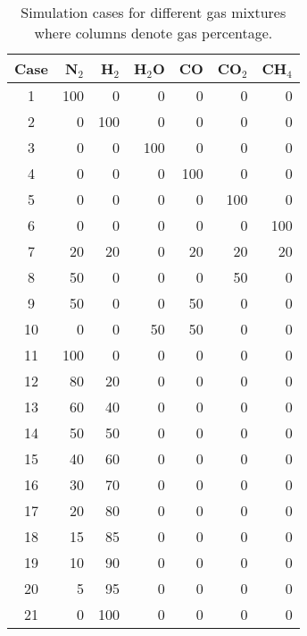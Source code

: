 \begin{table}[H]
    \centering
    \caption{Simulation cases for different gas mixtures where columns denote gas percentage.}
    \begin{tabular}{crrrrrr}
        \hline
        Case    & N$_2$ & H$_2$     & H$_2$O    & CO    & CO$_2$    & CH$_4$    \\
        \hline
        1       & 100   & 0         & 0         & 0     & 0         & 0         \\
        2       & 0     & 100       & 0         & 0     & 0         & 0         \\
        3       & 0     & 0         & 100       & 0     & 0         & 0         \\
        4       & 0     & 0         & 0         & 100   & 0         & 0         \\
        5       & 0     & 0         & 0         & 0     & 100       & 0         \\
        6       & 0     & 0         & 0         & 0     & 0         & 100       \\
        7       & 20    & 20        & 0         & 20    & 20        & 20        \\
        8       & 50    & 0         & 0         & 0     & 50        & 0         \\
        9       & 50    & 0         & 0         & 50    & 0         & 0         \\
        10      & 0     & 0         & 50        & 50    & 0         & 0         \\
        11      & 100   & 0         & 0         & 0     & 0         & 0         \\
        12      & 80    & 20        & 0         & 0     & 0         & 0         \\
        13      & 60    & 40        & 0         & 0     & 0         & 0         \\
        14      & 50    & 50        & 0         & 0     & 0         & 0         \\
        15      & 40    & 60        & 0         & 0     & 0         & 0         \\
        16      & 30    & 70        & 0         & 0     & 0         & 0         \\
        17      & 20    & 80        & 0         & 0     & 0         & 0         \\
        18      & 15    & 85        & 0         & 0     & 0         & 0         \\
        19      & 10    & 90        & 0         & 0     & 0         & 0         \\
        20      & 5     & 95        & 0         & 0     & 0         & 0         \\
        21      & 0     & 100       & 0         & 0     & 0         & 0         \\
        \hline
    \end{tabular}
    \label{tab:cases}
\end{table}

